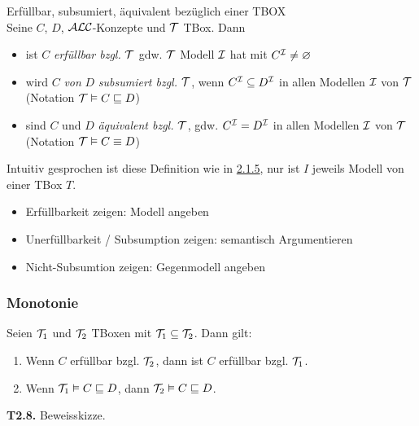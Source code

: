 \begin{definition}{Erfüllbar, subsumiert, äquivalent bezüglich einer TBOX} \\
Seine $C$, $D$, $\mathcal{A}\mathcal{L}\mathcal{C}$-Konzepte und $\mathcal{T}$ TBox. Dann

\begin{itemize}
  \item ist $C$ \emph{erfüllbar bzgl.} $\mathcal{T}$ gdw. $\mathcal{T}$ Modell $\mathcal{I}$ hat mit $C^{\mathcal{I}} \neq \varnothing$
  \item wird $C$ \emph{von} $D$ \emph{subsumiert bzgl.} $\mathcal{T}$, wenn $C^{\mathcal{I}} \subseteq D^{\mathcal{I}}$ in allen Modellen $\mathcal{I}$ von $\mathcal{T}$ (Notation $\mathcal{T} \vDash C \sqsubseteq D$)
  \item sind $C$ und $D$ \emph{äquivalent bzgl.} $\mathcal{T}$, gdw. $C^{\mathcal{I}} = D^{\mathcal{I}}$ in allen Modellen $\mathcal{I}$ von $\mathcal{T}$ (Notation $\mathcal{T} \vDash C \equiv D$)
\end{itemize}
\end{definition}

Intuitiv gesprochen ist diese Definition wie in \protect\hyperlink{erfuxfcllbarkeit-subsumtion-uxe4quivalenz}{2.1.5}, nur ist $I$ jeweils Modell von einer TBox $T$.

\begin{itemize}
\item
  Erfüllbarkeit zeigen: Modell angeben
\item
  Unerfüllbarkeit / Subsumption zeigen: semantisch Argumentieren
\item
  Nicht-Subsumtion zeigen: Gegenmodell angeben
\end{itemize}

\subsubsection{Monotonie}\label{monotonie}

\begin{lemma}
Seien $\mathcal{T}_{1}$ und $\mathcal{T}_{2}$ TBoxen mit $\mathcal{T}_{1} \subseteq \mathcal{T}_{2}$. Dann gilt:
\end{lemma}

\begin{enumerate}
\def\labelenumi{\arabic{enumi}.}
\item
  Wenn $C$ erfüllbar bzgl. $\mathcal{T}_{2}$, dann ist $C$ erfüllbar bzgl.
  $\mathcal{T}_{1}$.
\item
  Wenn $\mathcal{T}_{1} \vDash C \sqsubseteq D$, dann
  $\mathcal{T}_{2} \vDash C \sqsubseteq D$.
\end{enumerate}

\textbf{T2.8.} Beweisskizze.

